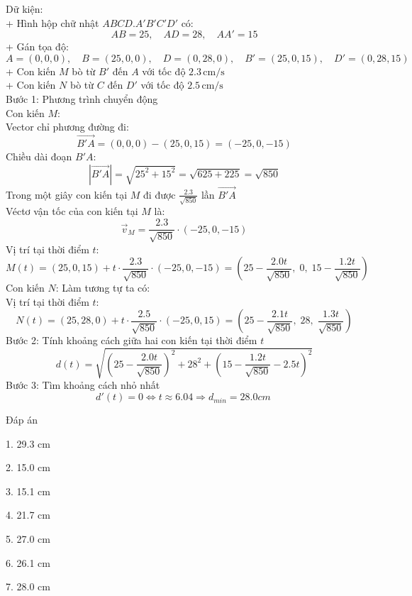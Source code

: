 \documentclass[a4paper,12pt]{article}
\begin{document}
Dữ kiện:\\
+ Hình hộp chữ nhật \(ABCD.A'B'C'D'\) có:\\
\[
AB = 25,\quad AD = 28,\quad AA' = 15
\]
+ Gán tọa độ:
\[
A = (0, 0, 0),\quad B = (25, 0, 0),\quad D = (0, 28, 0),\quad B' = (25, 0, 15),\quad D' = (0, 28, 15)
\]
+ Con kiến \(M\) bò từ \(B'\) đến \(A\) với tốc độ \(2.3\, \text{cm/s}\)\\
+ Con kiến \(N\) bò từ \(C\) đến \(D'\) với tốc độ \(2.5\, \text{cm/s}\)\\
Bước 1: Phương trình chuyển động\\
Con kiến \(M\):\\
Vector chỉ phương đường đi:
\[
\overrightarrow{B'A} = (0, 0, 0) - (25, 0, 15) = ( -25, 0, -15 )
\]
Chiều dài đoạn \(B'A\):
\[
|\overrightarrow{B'A}| = \sqrt{25^2 + 15^2} = \sqrt{625 + 225} = \sqrt{850}
\]
Trong một giây con kiến tại \(M\) đi được \(\frac{2.3}{\sqrt{850}}\) lần \(\overrightarrow{B'A}\)\\
Véctơ vận tốc của con kiến tại \(M\) là:
\[
\overrightarrow{v}_M = \frac{2.3}{\sqrt{850}} \cdot ( -25, 0, -15 )
\]
Vị trí tại thời điểm \(t\):
\[
M(t) = (25, 0, 15) + t \cdot \frac{2.3}{\sqrt{850}} \cdot ( -25, 0, -15 )
= \left( 25 - \frac{2.0t}{\sqrt{850}},\; 0,\; 15 - \frac{1.2t}{\sqrt{850}} \right)
\]
Con kiến \(N\): Làm tương tự ta có:\\
Vị trí tại thời điểm \(t\):
\[
N(t) = (25, 28, 0) + t \cdot \frac{2.5}{\sqrt{850}} \cdot (-25, 0, 15)
= \left( 25 - \frac{2.1t}{\sqrt{850}},\; 28,\; \frac{1.3t}{\sqrt{850}} \right)
\]
Bước 2: Tính khoảng cách giữa hai con kiến tại thời điểm \(t\)
\[
d(t) = \sqrt{\left(25 - \frac{2.0t}{\sqrt{850}}\right)^2 + 28^2 + \left(15 - \frac{1.2t}{\sqrt{850}} - 2.5t\right)^2}
\]
Bước 3: Tìm khoảng cách nhỏ nhất
\[
d'(t)=0\Leftrightarrow t \approx 6.04 \Rightarrow d_{min}=28.0cm\
\]




Đáp án

1. 29.3 cm

2. 15.0 cm

3. 15.1 cm

4. 21.7 cm

5. 27.0 cm

6. 26.1 cm

7. 28.0 cm
\end{document}
